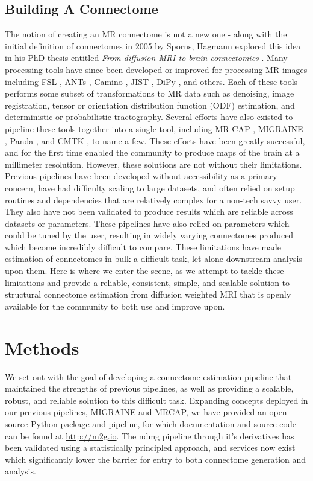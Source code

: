 \section{Building A Connectome}
\label{sec:previous}
The notion of creating an MR connectome is not a new one - along with the initial definition of connectomes in 2005 by Sporns, Hagmann explored this idea in his PhD thesis entitled \textit{From diffusion MRI to brain connectomics} \cite{hagman2005}. Many processing tools have since been developed or improved for processing MR images including FSL \cite{fsl1, fsl2,fsl3}, ANTs \cite{ants}, Camino \cite{camino}, JIST \cite{jist}, DiPy \cite{dipy}, and others. Each of these tools performs some subset of transformations to MR data such as denoising, image registration, tensor or orientation distribution function (ODF) estimation, and deterministic or probabilistic tractography. Several efforts have also existed to pipeline these tools together into a single tool, including MR-CAP \cite{mrcap}, MIGRAINE \cite{migraine}, Panda \cite{panda}, and CMTK \cite{cmtk}, to name a few. These efforts have been greatly successful, and for the first time enabled the community to produce maps of the brain at a millimeter resolution. However, these solutions are not without their limitations. Previous pipelines have been developed without accessibility as a primary concern, have had difficulty scaling to large datasets, and often relied on setup routines and dependencies that are relatively complex for a non-tech savvy user. They also have not been validated to produce results which are reliable across datasets or parameters. These pipelines have also relied on parameters which could be tuned by the user, resulting in widely varying connectomes produced which become incredibly difficult to compare. These limitations have made estimation of connectomes in bulk a difficult task, let alone downstream analysis upon them. Here is where we enter the scene, as we attempt to tackle these limitations and provide a reliable, consistent, simple, and scalable solution to structural connectome estimation from diffusion weighted MRI that is openly available for the community to both use and improve upon.

\chapter{Methods}
\label{sec:ndmg}
We set out with the goal of developing a connectome estimation pipeline that maintained the strengths of previous pipelines, as well as providing a scalable, robust, and reliable solution to this difficult task. Expanding concepts deployed in our previous pipelines, MIGRAINE and MRCAP, we have provided an open-source Python package and pipeline, for which documentation and source code can be found at \url{http://m2g.io}. The ndmg pipeline through it's derivatives has been validated using a statistically principled approach, and services now exist which significantly lower the barrier for entry to both connectome generation and analysis.
